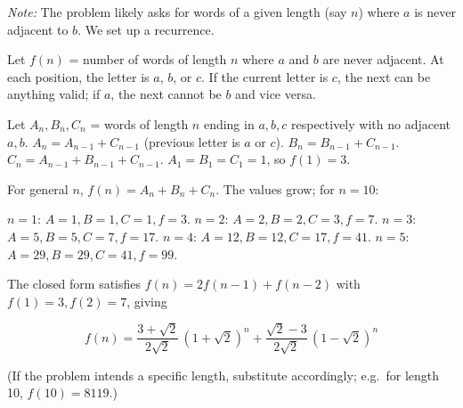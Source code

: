 \textit{Note:} The problem likely asks for words of a given length (say $n$) where $a$ is never adjacent to $b$. We set up a recurrence.

Let $f(n)$ = number of words of length $n$ where $a$ and $b$ are never adjacent. At each position, the letter is $a$, $b$, or $c$. If the current letter is $c$, the next can be anything valid; if $a$, the next cannot be $b$ and vice versa.

Let $A_n, B_n, C_n$ = words of length $n$ ending in $a, b, c$ respectively with no adjacent $a,b$.
$A_n = A_{n-1}+C_{n-1}$ (previous letter is $a$ or $c$).
$B_n = B_{n-1}+C_{n-1}$.
$C_n = A_{n-1}+B_{n-1}+C_{n-1}$.
$A_1=B_1=C_1=1$, so $f(1)=3$.

For general $n$, $f(n) = A_n+B_n+C_n$. The values grow; for $n=10$:

$n=1$: $A=1,B=1,C=1,f=3$.
$n=2$: $A=2,B=2,C=3,f=7$.
$n=3$: $A=5,B=5,C=7,f=17$.
$n=4$: $A=12,B=12,C=17,f=41$.
$n=5$: $A=29,B=29,C=41,f=99$.

The closed form satisfies $f(n)=2f(n-1)+f(n-2)$ with $f(1)=3, f(2)=7$, giving

\[
\boxed{f(n) = \frac{3+\sqrt{2}}{2\sqrt{2}}\,(1+\sqrt{2})^n + \frac{\sqrt{2}-3}{2\sqrt{2}}\,(1-\sqrt{2})^n}
\]

(If the problem intends a specific length, substitute accordingly; e.g.\ for length 10, $f(10)=8119$.)

